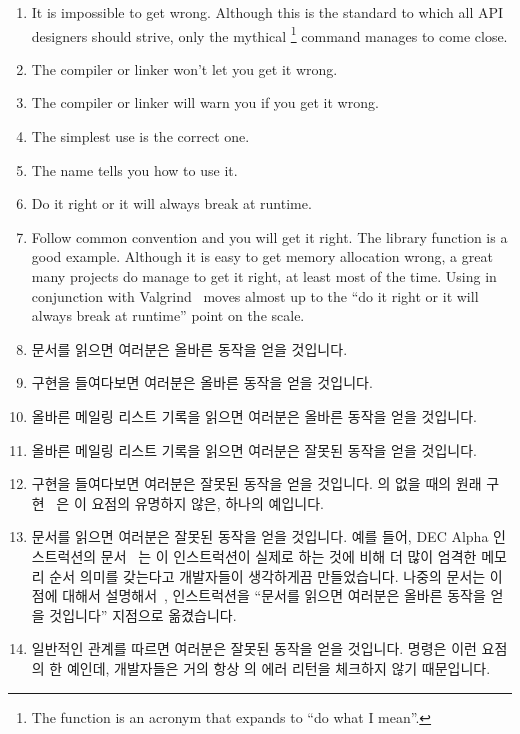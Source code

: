 \begin{enumerate}
\item	It is impossible to get wrong.
	Although this is the standard to which all API designers should
	strive, only the mythical \footnote{
		The  function is an acronym that expands to
		``do what I mean''.}
	command manages to come close.
\item	The compiler or linker won't let you get it wrong.
\item	The compiler or linker will warn you if you get it wrong.
\item	The simplest use is the correct one.
\item	The name tells you how to use it.
\item	Do it right or it will always break at runtime.
\item	Follow common convention and you will get it right.
	The  library function is a good example.
	Although it is easy to get memory allocation wrong, a
	great many projects do manage to get it right, at least most
	of the time.
	Using  in conjunction with
	Valgrind~\cite{ValgrindHomePage} moves 
	almost up to the ``do it right or it will always break at runtime''
	point on the scale.
\fi
\item	문서를 읽으면 여러분은 올바른 동작을 얻을 것입니다.
\item	구현을 들여다보면 여러분은 올바른 동작을 얻을 것입니다.
\item	올바른 메일링 리스트 기록을 읽으면 여러분은 올바른 동작을 얻을 것입니다.
\item	올바른 메일링 리스트 기록을 읽으면 여러분은 잘못된 동작을 얻을 것입니다.
\item	구현을 들여다보면 여러분은 잘못된 동작을 얻을 것입니다.
	 의  없을 때의 원래
	구현~\cite{PaulEMcKenney2007PreemptibleRCU} 은 이 요점의 유명하지 않은,
	하나의 예입니다.
\item	문서를 읽으면 여러분은 잘못된 동작을 얻을 것입니다.
	예를 들어, DEC Alpha  인스트럭션의 문서~\cite{ALPHA95} 는 이
	인스트럭션이 실제로 하는 것에 비해 더 많이 엄격한 메모리 순서 의미를
	갖는다고 개발자들이 생각하게끔 만들었습니다.
	나중의 문서는 이 점에 대해서 설명해서~\cite{Compaq01}, 
	인스트럭션을 ``문서를 읽으면 여러분은 올바른 동작을 얻을 것입니다''
	지점으로 옮겼습니다.
\item	일반적인 관계를 따르면 여러분은 잘못된 동작을 얻을 것입니다.
	 명령은 이런 요점의 한 예인데, 개발자들은 거의 항상
	 의 에러 리턴을 체크하지 않기 때문입니다.
\iffalse


\end{enumerate}
